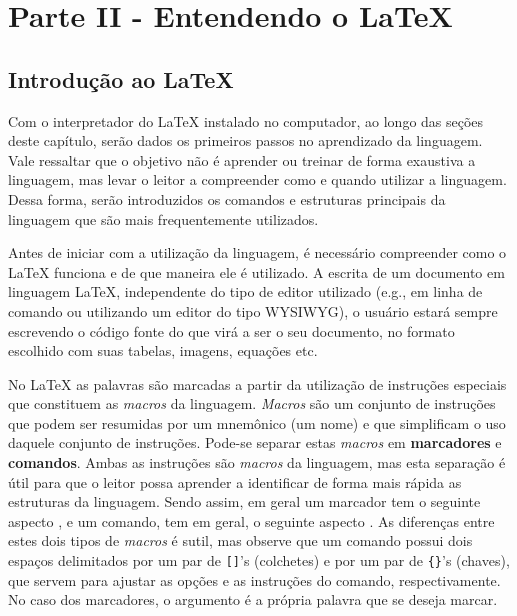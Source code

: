 \chapter{Parte II - Entendendo o \LaTeX{}}
\label{cap:parteII}

\section{Introdução ao \LaTeX{}}
\label{sec:intro_latex}

Com o interpretador do \LaTeX{} instalado no computador, ao longo das seções deste capítulo, serão dados os primeiros passos no aprendizado da linguagem. Vale ressaltar que o objetivo não é aprender ou treinar de forma exaustiva a linguagem, mas levar o leitor a compreender como e quando utilizar a linguagem. Dessa forma, serão introduzidos os comandos e estruturas principais da linguagem que são mais frequentemente utilizados.

Antes de iniciar com a utilização da linguagem, é necessário compreender como o \LaTeX{} funciona e de que maneira ele é utilizado. A escrita de um documento em linguagem \LaTeX{}, independente do tipo de editor utilizado (e.g., em linha de comando ou utilizando um editor do tipo WYSIWYG), o usuário estará sempre escrevendo o código fonte do que virá a ser o seu documento, no formato escolhido com suas tabelas, imagens, equações etc.


No \LaTeX{} as palavras são marcadas a partir da utilização de instruções especiais que constituem as \textit{macros} da linguagem. \textit{Macros} são um conjunto de instruções que podem ser resumidas por um mnemônico (um nome) e que simplificam o uso daquele conjunto de instruções. Pode-se separar estas \textit{macros} em \textbf{marcadores} e \textbf{comandos}. Ambas as instruções são \textit{macros} da linguagem, mas esta separação é útil para que o leitor possa aprender a identificar de forma mais rápida as estruturas da linguagem. Sendo assim, em geral um marcador tem o seguinte aspecto \texttt{\marcador{}}, e um comando, tem em geral, o seguinte aspecto \texttt{\comando[]{}}. As diferenças entre estes dois tipos de \textit{macros} é sutil, mas observe que um comando possui dois espaços delimitados por um par de {\tt []}'s (colchetes) e por um par de {\tt \{\}}'s (chaves), que servem para ajustar as opções e as instruções do comando, respectivamente. No caso dos marcadores, o argumento é a própria palavra que se deseja marcar.

